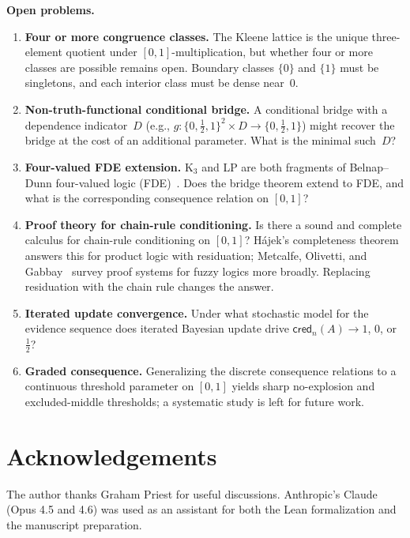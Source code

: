 \documentclass[11pt,a4paper]{article}
\newcommand{\cred}{\mathsf{cred}}
\begin{document}
\textbf{Open problems.}
\begin{enumerate}[nosep]
\item \textbf{Four or more congruence classes.}
  The Kleene lattice is the unique three-element quotient
  under $[0,1]$-multiplication, but whether four or more
  classes are possible remains open.
  Boundary classes $\{0\}$ and $\{1\}$ must be singletons,
  and each interior class must be dense near~$0$.
\item \textbf{Non-truth-functional conditional bridge.}
  A conditional bridge with a dependence indicator~$D$
  (e.g., $g : \{0, \tfrac{1}{2}, 1\}^2 \times D \to
  \{0, \tfrac{1}{2}, 1\}$) might recover the bridge at the
  cost of an additional parameter.
  What is the minimal such~$D$?
\item \textbf{Four-valued FDE extension.}
  K$_3$ and LP are both fragments of Belnap--Dunn four-valued logic
  (FDE)~\cite{belnap1977,dunn1976}.
  Does the bridge theorem extend to FDE, and what is the
  corresponding consequence relation on $[0,1]$?
\item \textbf{Proof theory for chain-rule conditioning.}
  Is there a sound and complete calculus for chain-rule conditioning
  on $[0,1]$?
  H\'ajek's completeness theorem~\cite{hajek1998} answers this for
  product logic with residuation;
  Metcalfe, Olivetti, and Gabbay~\cite{metcalfe2009} survey proof
  systems for fuzzy logics more broadly.
  Replacing residuation with the chain rule changes the answer.
\item \textbf{Iterated update convergence.}
  Under what stochastic model for the evidence sequence does
  iterated Bayesian update drive $\cred_n(A) \to 1$, $0$, or
  $\tfrac{1}{2}$?
\item \textbf{Graded consequence.}
  Generalizing the discrete consequence relations to a continuous
  threshold parameter on $[0,1]$ yields sharp no-explosion and
  excluded-middle thresholds; a systematic study is left for
  future work.
\end{enumerate}

\section*{Acknowledgements}

The author thanks Graham Priest for useful discussions.
Anthropic's Claude (Opus 4.5 and 4.6) was used as an assistant for both
the Lean formalization and the manuscript preparation.

\end{document}
